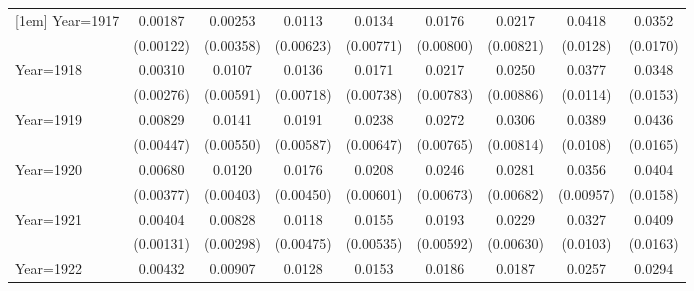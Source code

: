 \begin{table}[htbp]
\begin{tabular}{l*{8}{c}}
[1em]
Year=1917           &     0.00187         &     0.00253         &      0.0113\sym{*}  &      0.0134\sym{*}  &      0.0176\sym{**} &      0.0217\sym{***}&      0.0418\sym{***}&      0.0352\sym{**} \\
                    &   (0.00122)         &   (0.00358)         &   (0.00623)         &   (0.00771)         &   (0.00800)         &   (0.00821)         &    (0.0128)         &    (0.0170)         \\
[1em]
Year=1918           &     0.00310         &      0.0107\sym{*}  &      0.0136\sym{*}  &      0.0171\sym{**} &      0.0217\sym{***}&      0.0250\sym{***}&      0.0377\sym{***}&      0.0348\sym{**} \\
                    &   (0.00276)         &   (0.00591)         &   (0.00718)         &   (0.00738)         &   (0.00783)         &   (0.00886)         &    (0.0114)         &    (0.0153)         \\
[1em]
Year=1919           &     0.00829\sym{*}  &      0.0141\sym{**} &      0.0191\sym{***}&      0.0238\sym{***}&      0.0272\sym{***}&      0.0306\sym{***}&      0.0389\sym{***}&      0.0436\sym{***}\\
                    &   (0.00447)         &   (0.00550)         &   (0.00587)         &   (0.00647)         &   (0.00765)         &   (0.00814)         &    (0.0108)         &    (0.0165)         \\
[1em]
Year=1920           &     0.00680\sym{*}  &      0.0120\sym{***}&      0.0176\sym{***}&      0.0208\sym{***}&      0.0246\sym{***}&      0.0281\sym{***}&      0.0356\sym{***}&      0.0404\sym{**} \\
                    &   (0.00377)         &   (0.00403)         &   (0.00450)         &   (0.00601)         &   (0.00673)         &   (0.00682)         &   (0.00957)         &    (0.0158)         \\
[1em]
Year=1921           &     0.00404\sym{***}&     0.00828\sym{***}&      0.0118\sym{**} &      0.0155\sym{***}&      0.0193\sym{***}&      0.0229\sym{***}&      0.0327\sym{***}&      0.0409\sym{**} \\
                    &   (0.00131)         &   (0.00298)         &   (0.00475)         &   (0.00535)         &   (0.00592)         &   (0.00630)         &    (0.0103)         &    (0.0163)         \\
[1em]
Year=1922           &     0.00432\sym{*}  &     0.00907\sym{*}  &      0.0128\sym{**} &      0.0153\sym{**} &      0.0186\sym{***}&      0.0187\sym{***}&      0.0257\sym{**} &      0.0294\sym{*}  \\

\end{tabular}
\end{table}
